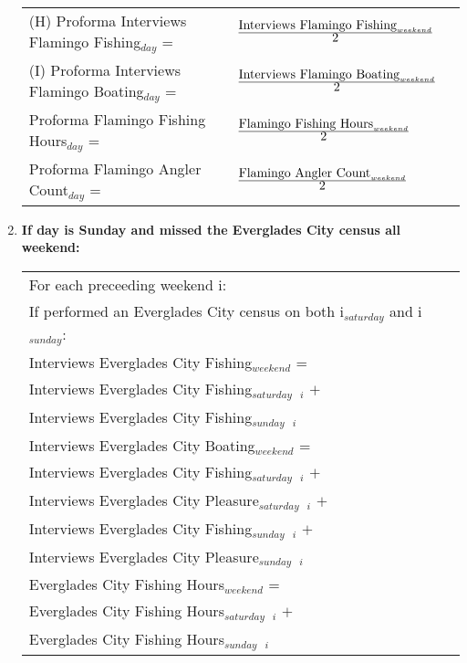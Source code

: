 \documentclass[letterpaper,12pt]{article}
\newcommand{\hspacer}{\hspace*{1cm}}
\newcommand{\fraction}[1]{\textrm{\normalsize{#1}}}
\begin{document}
\begin{enumerate}
\begin{tabular}{l@{ }l@{ }l}
	(H) Proforma Interviews Flamingo Fishing$_{day}$ =
		& $
\frac
	{\fraction{Interviews Flamingo Fishing}_{weekend}}
      	{\fraction{2}}
		$ \\

	(I) Proforma Interviews Flamingo Boating$_{day}$ =
		& $
\frac
	{\fraction{Interviews Flamingo Boating}_{weekend}}
      	{\fraction{2}}
		$ \\

	Proforma Flamingo Fishing Hours$_{day}$ =
		& $
\frac
	{\fraction{Flamingo Fishing Hours}_{weekend}}
	{\fraction{2}}
		$ \\

	Proforma Flamingo Angler Count$_{day}$ =
		& $
\frac
	{\fraction{Flamingo Angler Count}_{weekend}}
	{\fraction{2}}
		$ \\
\end{tabular}

\item
\textbf{If day is Sunday and missed the Everglades City census all weekend:} \\
\begin{tabular}{l@{ }l@{ }l}
	For each preceeding weekend i: \\
\hspacer If performed an Everglades City census on both i$_{saturday}$ and i$_{sunday}$: \\
\hspacer \hspacer Interviews Everglades City Fishing$_{weekend}$ = \\
\hspacer \hspacer \hspacer Interviews Everglades City Fishing$_{saturday}$\ $_{i}$ $+$ \\
\hspacer \hspacer \hspacer Interviews Everglades City Fishing$_{sunday}$\ $_{i}$ \\

\hspacer \hspacer Interviews Everglades City Boating$_{weekend}$ = \\
\hspacer \hspacer \hspacer Interviews Everglades City Fishing$_{saturday}$\ $_{i}$ $+$ \\
\hspacer \hspacer \hspacer Interviews Everglades City Pleasure$_{saturday}$\ $_{i}$ $+$ \\
\hspacer \hspacer \hspacer Interviews Everglades City Fishing$_{sunday}$\ $_{i}$ $+$ \\
\hspacer \hspacer \hspacer Interviews Everglades City Pleasure$_{sunday}$\ $_{i}$ \\

\hspacer \hspacer Everglades City Fishing Hours$_{weekend}$ = \\
\hspacer \hspacer \hspacer Everglades City Fishing Hours$_{saturday}$\ $_{i}$ $+$ \\
\hspacer \hspacer \hspacer Everglades City Fishing Hours$_{sunday}$\ $_{i}$ \\


\end{tabular}
\end{enumerate}
\end{document}
